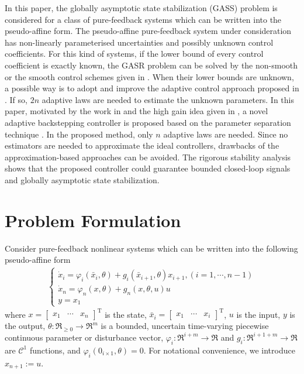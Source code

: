 \documentclass{tSYS2e}
\theoremstyle{plain}
\theoremstyle{definition}
\begin{document}
In this paper, the globally asymptotic state stabilization (GASS) problem is
considered for a class of pure-feedback systems which can be written into the pseudo-affine form.
The  pseudo-affine pure-feedback system under consideration has non-linearly parameterised uncertainties
and possibly unknown control coefficients. For this kind of systems,
if the lower bound of every control coefficient is exactly known,
the GASR problem can be solved by the non-smooth or the smooth control schemes given in \cite{Lin2002a, Lin2002b}.
When their lower bounds are unknown, a possible way is to adopt and improve the adaptive control approach proposed in \cite{Sun2007}. If so, $2n$ adaptive laws are needed to estimate the unknown parameters.
In this paper, motivated by the work in \cite{Ye1999} and the high gain idea given in \cite{Lei2006},
a novel adaptive backstepping controller is proposed based on the parameter separation technique \citep{Lin2002a,Lin2002b}.
In the proposed method, only $n$ adaptive laws are needed. Since no estimators are needed to approximate the
ideal controllers, drawbacks of the approximation-based approaches can be avoided.
The rigorous stability analysis shows that the proposed controller could guarantee bounded closed-loop signals and globally
asymptotic state stabilization.


\section{Problem Formulation}
Consider pure-feedback nonlinear systems which can be written into the following pseudo-affine form
\begin{eqnarray}
\left\{
\begin{array}{l}
\dot{x}_{i} =\varphi _{i}(\bar{x}_{i},\theta )+g_{i}(\bar{x}_{i+1},\theta)x_{i+1}, (i=1,\cdots,n-1) \\
\dot{x}_{n} =\varphi _{n}(x,\theta )+g_n(x,\theta,u)u\\
y=x_1
\end{array}
\right.  \label{System0}
\end{eqnarray}
where $x=[
\begin{array}{ccc}
x_{1} & \cdots & x_{n}
\end{array}
]^{\mathrm{T}}$ is the state, $\bar{x}_{i}=[
\begin{array}{ccc}
x_{1} & \cdots & x_{i}
\end{array}
]^{\mathrm{T}}$, $u$ is the input, $y$ is the output, $\theta :\Re _{\geq 0}\rightarrow \Re ^{m}$ is a
bounded, uncertain time-varying piecewise continuous parameter or disturbance vector,
$\varphi_{i}:\Re^{i+m}\rightarrow \Re $ and $g_{i}:\Re^{i+1+m}\rightarrow \Re $ are
$\mathcal{C}^{1}$ functions, and $\varphi_{i}(0_{i\times 1},\theta)=0$.
For notational convenience, we introduce $x_{n+1}:=u$.
\end{document}
